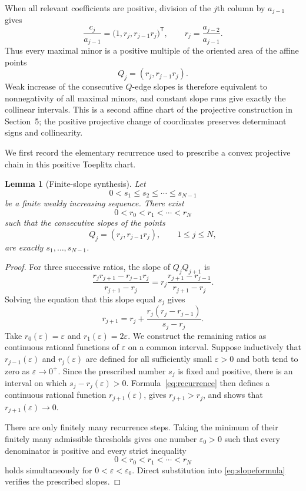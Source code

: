 \documentclass{amsart}
\numberwithin{equation}{section}
\newtheorem{lemma}[theorem]{Lemma}
\theoremstyle{definition}
\theoremstyle{remark}
\newcommand{\transpose}{\mathsf T}
\begin{document}
When all relevant coefficients are positive, division of the $j$th column by $a_{j-1}$ gives
\begin{equation}\label{eq:positive-chart}
 \frac{c_j}{a_{j-1}}
 =\bigl(1,r_j,r_{j-1}r_j\bigr)^{\transpose},
 \qquad
 r_j=\frac{a_{j-2}}{a_{j-1}}.
\end{equation}
Thus every maximal minor is a positive multiple of the oriented area of the affine points
\[
 Q_j=(r_j,r_{j-1}r_j).
\]
Weak increase of the consecutive $Q$-edge slopes is therefore equivalent to nonnegativity of all maximal minors, and constant slope runs give exactly the collinear intervals.  This is a second affine chart of the projective construction in Section~5; the positive projective change of coordinates preserves determinant signs and collinearity.

We first record the elementary recurrence used to prescribe a convex projective chain in this positive Toeplitz chart.

\begin{lemma}[Finite-slope synthesis]\label{lem:slope-synthesis}
Let
\[
 0<s_1\le s_2\le\cdots\le s_{N-1}
\]
be a finite weakly increasing sequence.  There exist
\[
 0<r_0<r_1<\cdots<r_N
\]
such that the consecutive slopes of the points
\begin{equation}\label{eq:synthpoints}
 Q_j=(r_j,r_{j-1}r_j),
 \qquad 1\le j\le N,
\end{equation}
are exactly $s_1,\ldots,s_{N-1}$.
\end{lemma}

\begin{proof}
For three successive ratios, the slope of $Q_jQ_{j+1}$ is
\begin{equation}\label{eq:slopeformula}
 \frac{r_jr_{j+1}-r_{j-1}r_j}{r_{j+1}-r_j}
 =r_j\frac{r_{j+1}-r_{j-1}}{r_{j+1}-r_j}.
\end{equation}
Solving the equation that this slope equal $s_j$ gives
\begin{equation}\label{eq:recurrence}
 r_{j+1}
 =r_j+\frac{r_j(r_j-r_{j-1})}{s_j-r_j}.
\end{equation}
Take $r_0(\varepsilon)=\varepsilon$ and $r_1(\varepsilon)=2\varepsilon$.  We construct the remaining ratios as continuous rational functions of $\varepsilon$ on a common interval.  Suppose inductively that $r_{j-1}(\varepsilon)$ and $r_j(\varepsilon)$ are defined for all sufficiently small $\varepsilon>0$ and both tend to zero as $\varepsilon\to0^+$.  Since the prescribed number $s_j$ is fixed and positive, there is an interval on which $s_j-r_j(\varepsilon)>0$.  Formula~\eqref{eq:recurrence} then defines a continuous rational function $r_{j+1}(\varepsilon)$, gives $r_{j+1}>r_j$, and shows that $r_{j+1}(\varepsilon)\to0$.

There are only finitely many recurrence steps.  Taking the minimum of their finitely many admissible thresholds gives one number $\varepsilon_0>0$ such that every denominator is positive and every strict inequality
\[
 0<r_0<r_1<\cdots<r_N
\]
holds simultaneously for $0<\varepsilon<\varepsilon_0$.  Direct substitution into \eqref{eq:slopeformula} verifies the prescribed slopes.
\end{proof}
\end{document}
